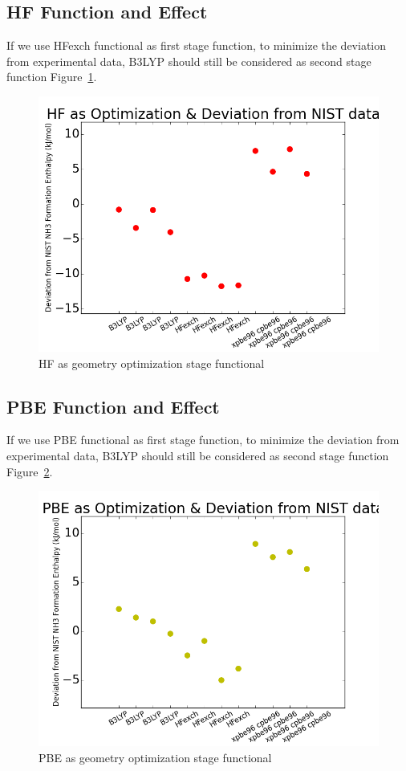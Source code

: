 \documentclass{article}
\begin{document}
\subsection{HF Function and Effect}
If we use HFexch functional as first stage function, to minimize the deviation from experimental data, B3LYP should still be considered as second stage function Figure~\ref{fig:HF}. 
\begin{figure}[ht]
\includegraphics[width=1\textwidth]{HF_Functional_1_Dev.png}
\caption{HF as geometry optimization stage functional}
\label{fig:HF}
\end{figure} 

\subsection{PBE Function and Effect}
If we use PBE functional as first stage function, to minimize the deviation from experimental data, B3LYP should still be considered as second stage function Figure~\ref{fig:PBE}. 
\begin{figure}[ht]
\includegraphics[width=1\textwidth]{PBE_Functional_1_Dev.png}
\caption{PBE as geometry optimization stage functional}
\label{fig:PBE}
\end{figure} 
\end{document}
